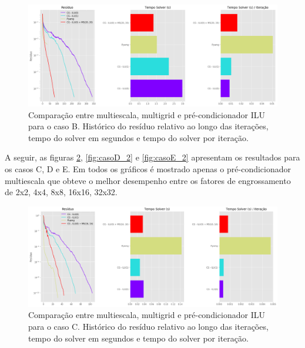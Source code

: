 \begin{figure}[!htbp]
\label{fig:reservatorio320x320_2}
\centering
\includegraphics[width=\textwidth]{chap08/figs/reservatorio320x320_2.png}
\caption{Comparação entre multiescala, multigrid e pré-condicionador ILU para o caso B. Histórico do resíduo relativo ao longo das iterações, tempo do solver em segundos e tempo do solver por iteração. }
\end{figure}


A seguir, as figuras \ref{fig:casoC_2}, \ref{fig:casoD_2} e \ref{fig:casoE_2} apresentam os resultados para os casos C, D e E. Em todos os gráficos é mostrado apenas o pré-condicionador multiescala que obteve o melhor desempenho entre os fatores de engrossamento de 2x2, 4x4, 8x8, 16x16, 32x32.



\begin{figure}[!htbp]
\label{fig:casoC_2}
\centering
\includegraphics[width=\textwidth]{chap08/figs/casoC_2.png}
\caption{Comparação entre multiescala, multigrid e pré-condicionador ILU para o caso C. Histórico do resíduo relativo ao longo das iterações, tempo do solver em segundos e tempo do solver por iteração. }
\end{figure}



